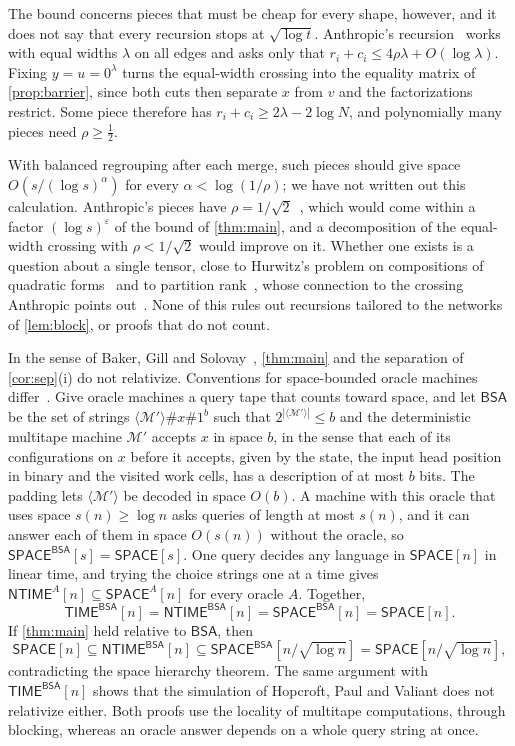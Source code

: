 \documentclass[11pt]{article}
\theoremstyle{definition}
\theoremstyle{definition}
\theoremstyle{remark}
\newcommand{\NTIME}{\mathsf{NTIME}}
\newcommand{\TIME}{\mathsf{TIME}}
\newcommand{\SPACE}{\mathsf{SPACE}}
\begin{document}
The bound concerns pieces that must be cheap for every shape, however, and it does not say that every recursion stops at $\sqrt{\log t}$. Anthropic's recursion~\cite{Ant26} works with equal widths $\lambda$ on all edges and asks only that $r_i+c_i\le4\rho\lambda+O(\log\lambda)$. Fixing $y=u=0^\lambda$ turns the equal-width crossing into the equality matrix of \cref{prop:barrier}, since both cuts then separate $x$ from $v$ and the factorizations restrict. Some piece therefore has $r_i+c_i\ge2\lambda-2\log N$, and polynomially many pieces need $\rho\ge\frac12$.

With balanced regrouping after each merge, such pieces should give space $O(s/(\log s)^{\alpha})$ for every $\alpha<\log(1/\rho)$; we have not written out this calculation. Anthropic's pieces have $\rho=1/\sqrt2$~\cite[Theorem~B]{Ant26}, which would come within a factor $(\log s)^{\varepsilon}$ of the bound of \cref{thm:main}, and a decomposition of the equal-width crossing with $\rho<1/\sqrt2$ would improve on it. Whether one exists is a question about a single tensor, close to Hurwitz's problem on compositions of quadratic forms~\cite{Hur98,Sha00} and to partition rank~\cite{Nas20}, whose connection to the crossing Anthropic points out~\cite{Ant26}. None of this rules out recursions tailored to the networks of \cref{lem:block}, or proofs that do not count.

\begin{remark}[Relativization]\label{rem:relativize}
In the sense of Baker, Gill and Solovay~\cite{BGS75}, \cref{thm:main} and the separation of \cref{cor:sep}(i) do not relativize. Conventions for space-bounded oracle machines differ~\cite{LL76,RST84}. Give oracle machines a query tape that counts toward space, and let $\mathsf{BSA}$ be the set of strings $\langle\mathcal M'\rangle\#x\#1^b$ such that $2^{|\langle\mathcal M'\rangle|}\le b$ and the deterministic multitape machine $\mathcal M'$ accepts $x$ in space $b$, in the sense that each of its configurations on $x$ before it accepts, given by the state, the input head position in binary and the visited work cells, has a description of at most $b$ bits. The padding lets $\langle\mathcal M'\rangle$ be decoded in space $O(b)$. A machine with this oracle that uses space $s(n)\ge\log n$ asks queries of length at most $s(n)$, and it can answer each of them in space $O(s(n))$ without the oracle, so $\SPACE^{\mathsf{BSA}}[s]=\SPACE[s]$. One query decides any language in $\SPACE[n]$ in linear time, and trying the choice strings one at a time gives $\NTIME^A[n]\subseteq\SPACE^A[n]$ for every oracle $A$. Together,
\[\TIME^{\mathsf{BSA}}[n]=\NTIME^{\mathsf{BSA}}[n]=\SPACE^{\mathsf{BSA}}[n]=\SPACE[n].\]
If \cref{thm:main} held relative to $\mathsf{BSA}$, then\[\SPACE[n]\subseteq\NTIME^{\mathsf{BSA}}[n]\subseteq\SPACE^{\mathsf{BSA}}[n/\sqrt{\log n}]=\SPACE[n/\sqrt{\log n}],\]contradicting the space hierarchy theorem. The same argument with $\TIME^{\mathsf{BSA}}[n]$ shows that the simulation of Hopcroft, Paul and Valiant does not relativize either. Both proofs use the locality of multitape computations, through blocking, whereas an oracle answer depends on a whole query string at once.
\end{remark}
\end{document}
